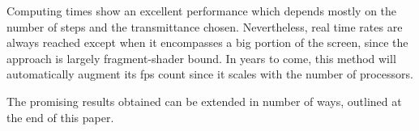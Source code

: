 \documentclass[oneside,a4paper,english,links]{amca}
\begin{document}
Computing times show an excellent performance which depends mostly on
the number of steps and the transmittance chosen. Nevertheless, real
time rates are always reached except when it encompasses a big portion
of the screen, since the approach is largely fragment-shader bound. In
years to come, this method will automatically augment its fps count
since it scales with the number of processors.

The promising results obtained can be extended in number of ways,
outlined at the end of this paper.












\end{document}
